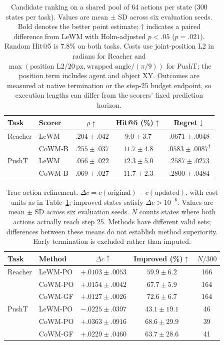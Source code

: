 \begin{table}[t]
\centering
\small
\setlength{\tabcolsep}{3pt}
\begin{tabular}{llccc}
\toprule
Task & Scorer & $\rho\uparrow$ & Hit@5 (\%)$\uparrow$ & Regret$\downarrow$ \\
\midrule
Reacher & LeWM & $.204\pm.042$ & $9.0\pm3.7$ & $.0671\pm.0048$ \\
& CoWM-B & $\mathbf{.255\pm.037}$ & $\mathbf{11.7\pm4.8}$ & $\mathbf{.0583\pm.0087}^{\dagger}$ \\
\midrule
PushT & LeWM & $.056\pm.022$ & $\mathbf{12.3\pm5.0}$ & $\mathbf{.2587\pm.0273}$ \\
& CoWM-B & $\mathbf{.069\pm.027}$ & $11.7\pm2.3$ & $.2800\pm.0484$ \\
\bottomrule
\end{tabular}
\caption{Candidate ranking on a shared pool of 64 actions per state (300 states per task). Values are mean $\pm$ SD across six evaluation seeds. Bold denotes the better point estimate; $\dagger$ indicates a paired difference from LeWM with Holm-adjusted $p<.05$ ($p=.021$). Random Hit@5 is 7.8\% on both tasks. Costs use joint-position L2 in radians for Reacher and $\max(\text{position L2}/20\,\text{px},\text{wrapped angle}/(\pi/9))$ for PushT; the position term includes agent and object XY. Outcomes are measured at native termination or the step-25 budget endpoint, so execution lengths can differ from the scorers' fixed prediction horizon.}
\label{tab:table3a_reacher_pusht}
\end{table}

\begin{table}[t]
\centering
\small
\setlength{\tabcolsep}{3pt}
\begin{tabular}{llccc}
\toprule
Task & Method & $\Delta c\uparrow$ & Improved (\%)$\uparrow$ & $N/300$ \\
\midrule
Reacher & LeWM-PO & $+.0103\pm.0053$ & $59.9\pm6.2$ & 166 \\
& CoWM-PO & $+.0154\pm.0042$ & $67.7\pm5.9$ & 164 \\
& CoWM-GF & $+.0127\pm.0026$ & $72.6\pm6.7$ & 164 \\
\midrule
PushT & LeWM-PO & $-.0225\pm.0397$ & $43.1\pm19.1$ & 46 \\
& CoWM-PO & $+.0363\pm.0916$ & $68.6\pm29.9$ & 39 \\
& CoWM-GF & $+.0229\pm.0460$ & $63.7\pm28.6$ & 41 \\
\bottomrule
\end{tabular}
\caption{True action refinement. $\Delta c=c(\text{original})-c(\text{updated})$, with cost units as in Table~\ref{tab:table3a_reacher_pusht}; improved states satisfy $\Delta c>10^{-6}$. Values are mean $\pm$ SD across six evaluation seeds. $N$ counts states where both actions actually reach step 25. Methods have different valid sets; differences between these means do not establish method superiority. Early termination is excluded rather than imputed.}
\label{tab:table3b_reacher_pusht}
\end{table}

